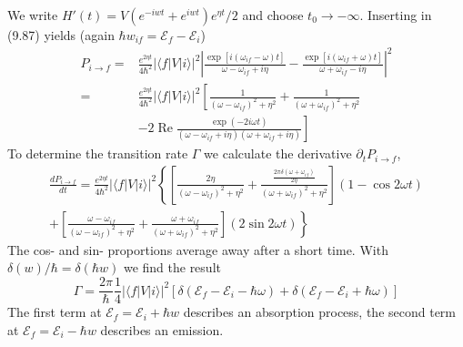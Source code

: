  We write $H' (t) = V(e^{− iwt} + e^{iwt}) e^{\eta t} / 2$ and choose $t_0\rightarrow-\infty$. Inserting in (9.87) yields (again $\hbar w_{if}=\mathcal{E}_f-\mathcal{E}_i$)
\begin{equation}
\begin{aligned} P_{i \rightarrow f}=& \frac{e^{2 \eta t}}{4 \hbar^{2}}|\langle f|V| i\rangle|^{2}\left|\frac{\exp \left[i\left(\omega_{i f}-\omega\right) t\right]}{\omega-\omega_{i f}+i \eta}-\frac{\exp \left[i\left(\omega_{i f}+\omega\right) t\right]}{\omega+\omega_{i f}-i \eta}\right|^{2} \\=& \frac{e^{2 \eta t}}{4 \hbar^{2}}|\langle f|V| i\rangle|^{2}\left[\frac{1}{\left(\omega-\omega_{i f}\right)^{2}+\eta^{2}}+\frac{1}{\left(\omega+\omega_{i f}\right)^{2}+\eta^{2}}\right.\\
&\left.-2 \operatorname{Re} \frac{\exp (-2 i \omega t)}{\left(\omega-\omega_{i f}+i \eta\right)\left(\omega+\omega_{i f}+i \eta\right)}\right] \end{aligned}
\end{equation}
To determine the transition rate $\Gamma$ we calculate the derivative $\partial_t P_{i\rightarrow f}$,
{\large{
\begin{equation}
    \begin{aligned}
        \frac{d P_{i \rightarrow f}}{d t}=\frac{e^{2 \eta t}}{4 \hbar^{2}}|\langle f|V| i\rangle|^{2}\left\{\left[\frac{2 \eta}{\left(\omega-\omega_{i f}\right)^{2}+\eta^{2}}+\frac{\frac{2 \pi \delta\left(\omega+\omega_{i f}\right)}{2 \eta}}{\left(\omega+\omega_{i f}\right)^{2}+\eta^{2}}\right](1-\cos 2 \omega t)\right.\\
        \left.+\left[\frac{\omega-\omega_{i f}}{\left(\omega-\omega_{i f}\right)^{2}+\eta^{2}}+\frac{\omega+\omega_{i f}}{\left(\omega+\omega_{i f}\right)^{2}+\eta^{2}}\right](2 \sin 2 \omega t)\right\}
    \end{aligned}
\end{equation}}}
The cos- and sin- proportions average away after a short time. With $\delta(w)/\hbar=\delta(\hbar w)$ we find the result
\begin{equation}
    \Gamma=\frac{2 \pi}{\hbar} \frac{1}{4}|\langle f|V| i\rangle|^{2}\left[\delta\left(\mathcal{E}_{f}-\mathcal{E}_{i}-\hbar \omega\right)+\delta\left(\mathcal{E}_{f}-\mathcal{E}_{i}+\hbar \omega\right)\right]
    \end{equation}
The first term at $\mathcal{E}_f=\mathcal{E}_i+\hbar w$ describes an absorption process, the second term at $\mathcal{E}_f=\mathcal{E}_i-\hbar w$ describes an emission.
